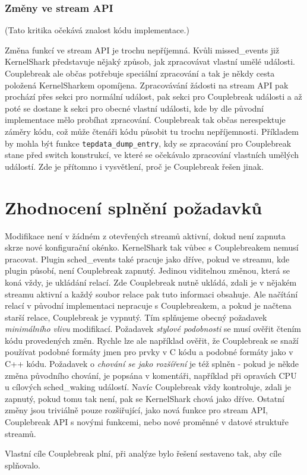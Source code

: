\subsubsection*{Změny ve stream API}
(Tato kritika očekává znalost kódu implementace.)

Změna funkcí ve stream API je trochu nepříjemná. Kvůli missed\_events již KernelShark představuje nějaký způsob, jak zpracovávat vlastní umělé události. Couplebreak ale občas potřebuje speciální zpracování a tak je někdy cesta položená KernelSharkem opomíjena. Zpracovávání žádosti na stream API pak prochází přes sekci pro normální událost, pak sekci pro Couplebreak události a až poté se dostane k sekci pro obecné vlastní události, kde by dle původní implementace mělo probíhat zpracování. Couplebreak tak občas nerespektuje záměry kódu, což může čtenáři kódu působit tu trochu nepříjemnosti. Příkladem by mohla být funkce \texttt{tepdata\_dump\_entry}, kdy se zpracování pro Couplebreak stane před switch konstrukcí, ve které se očekávalo zpracování vlastních umělých událostí. Zde je přítomno i vysvětlení, proč je Couplebreak řešen jinak.

\section{Zhodnocení splnění požadavků}
Modifikace není v žádném z otevřených streamů aktivní, dokud není zapnuta skrze nové konfigurační okénko. KernelShark tak vůbec s Couplebreakem nemusí pracovat. Plugin sched\_events také pracuje jako dříve, pokud ve streamu, kde plugin působí, není Couplebreak zapnutý. Jedinou viditelnou změnou, která se koná vždy, je ukládání relací. Zde Couplebreak nutně ukládá, zdali je v nějakém streamu aktivní a každý soubor relace pak tuto informaci obsahuje. Ale načítání relací v původní implementaci nepracuje s Couplebreakem, a pokud je načtena starší relace, Couplebreak je vypnutý. Tím splňujeme obecný požadavek \emph{minimálního vlivu} modifikací. Požadavek \emph{stylové podobnosti} se musí ověřit čtením kódu provedených změn. Rychle lze ale například ověřit, že Couplebreak se snaží používat podobné formáty jmen pro prvky v C kódu a podobné formáty jako v C++ kódu. Požadavek o \emph{chování se jako rozšíření} je též splněn - pokud je někde změna původního chování, je popsána v komentáři, například při opravách CPU u cílových sched\_waking událostí. Navíc Couplebreak vždy kontroluje, zdali je zapnutý, pokud tomu tak není, pak se KernelShark chová jako dříve. Ostatní změny jsou triviálně pouze rozšiřující, jako nová funkce pro stream API, Couplebreak API s novými funkcemi, nebo nové proměnné v datové struktuře streamů.

Vlastní cíle Couplebreak plní, při analýze bylo řešení sestaveno tak, aby cíle splňovalo.